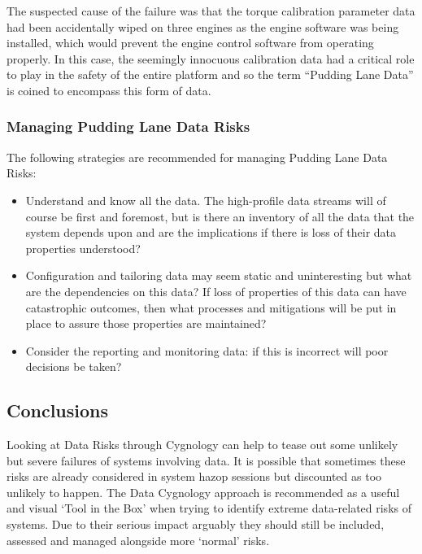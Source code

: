 The suspected cause of the failure was that the torque calibration parameter data had been
accidentally wiped on three engines as the engine software was being installed,
which would prevent the engine control software from operating properly.
In this case, the seemingly innocuous calibration data had a critical role to play in the
safety of the entire platform and so the term “Pudding Lane Data” is coined to encompass
this form of data.

\subsubsection{Managing Pudding Lane Data Risks}
The following strategies are recommended for managing Pudding Lane Data Risks:
\begin{itemize}
\item Understand and know all the data.
The high-profile data streams will of course be first and foremost, but is there an inventory of
all the data that the system depends upon and are the implications if there is loss of their data
properties understood? 
\item Configuration and tailoring data may seem static and uninteresting but what are the
dependencies on this data?
If loss of properties of this data can have catastrophic outcomes,
then what processes and mitigations will be put in place to assure those properties are maintained?
\item Consider the reporting and monitoring data: if this is incorrect will poor decisions be taken?
\end{itemize}

\subsection{Conclusions}
Looking at Data Risks through Cygnology can help to tease out some unlikely but severe failures of systems involving data. It is possible that sometimes these risks are already considered in system \gls{hazop} sessions but discounted as too unlikely to happen. The Data Cygnology approach is recommended as a useful and visual ‘Tool in the Box’ when trying to identify extreme data-related risks of systems.
Due to their serious impact arguably they should still be included, assessed and managed alongside more ‘normal’ risks.

